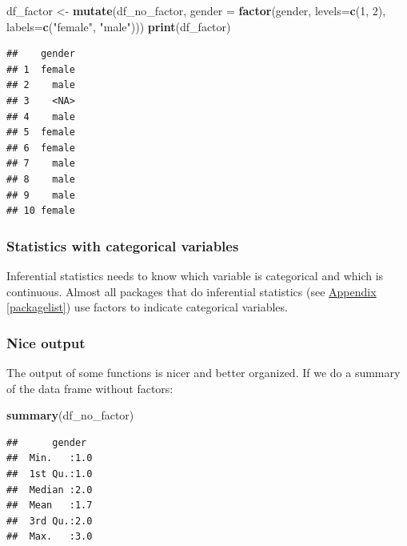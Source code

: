 \documentclass[
]{scrartcl}
\newenvironment{Shaded}{\begin{snugshade}}{\end{snugshade}}
\newcommand{\AttributeTok}[1]{\textcolor[rgb]{0.13,0.29,0.53}{#1}}
\newcommand{\DecValTok}[1]{\textcolor[rgb]{0.00,0.00,0.81}{#1}}
\newcommand{\FunctionTok}[1]{\textcolor[rgb]{0.13,0.29,0.53}{\textbf{#1}}}
\newcommand{\NormalTok}[1]{#1}
\newcommand{\OtherTok}[1]{\textcolor[rgb]{0.56,0.35,0.01}{#1}}
\newcommand{\StringTok}[1]{\textcolor[rgb]{0.31,0.60,0.02}{#1}}
\begin{document}
\begin{Shaded}
\begin{Highlighting}[]
\NormalTok{df\_factor }\OtherTok{\textless{}{-}}  \FunctionTok{mutate}\NormalTok{(df\_no\_factor,}
            \AttributeTok{gender =} \FunctionTok{factor}\NormalTok{(gender, }\AttributeTok{levels=}\FunctionTok{c}\NormalTok{(}\DecValTok{1}\NormalTok{, }\DecValTok{2}\NormalTok{), }\AttributeTok{labels=}\FunctionTok{c}\NormalTok{(}\StringTok{"female"}\NormalTok{, }\StringTok{"male"}\NormalTok{)))}
\FunctionTok{print}\NormalTok{(df\_factor)}
\end{Highlighting}
\end{Shaded}

\begin{verbatim}
##    gender
## 1  female
## 2    male
## 3    <NA>
## 4    male
## 5  female
## 6  female
## 7    male
## 8    male
## 9    male
## 10 female
\end{verbatim}

\hypertarget{statistics-with-categorical-variables}{%
\subsubsection{Statistics with categorical variables}\label{statistics-with-categorical-variables}}

Inferential statistics needs to know which variable is categorical and which is continuous. Almost all packages that do inferential statistics (see \protect\hyperlink{packagelist}{Appendix} \ref{packagelist}) use factors to indicate categorical variables.

\hypertarget{nice-output}{%
\subsubsection{Nice output}\label{nice-output}}

The output of some functions is nicer and better organized. If we do a summary of the data frame without factors:

\begin{Shaded}
\begin{Highlighting}[]
\FunctionTok{summary}\NormalTok{(df\_no\_factor)}
\end{Highlighting}
\end{Shaded}

\begin{verbatim}
##      gender   
##  Min.   :1.0  
##  1st Qu.:1.0  
##  Median :2.0  
##  Mean   :1.7  
##  3rd Qu.:2.0  
##  Max.   :3.0
\end{verbatim}
\end{document}
